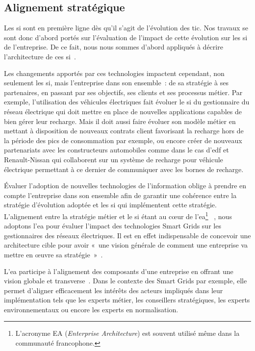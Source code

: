 \subsection{Alignement stratégique}

Les \gls{si} sont en première ligne dès qu'il s'agit de l'évolution des 
\gls{tic}. Nos 
travaux se sont donc d'abord portés sur l'évaluation de l'impact de cette 
évolution sur les \gls{si} de l'entreprise. De ce fait, nous nous sommes d'abord 
appliqués à décrire l'architecture de ces \gls{si}~\cite{seghiri2015simulation}. 

Les changements apportés par ces technologies impactent cependant, non seulement 
les \gls{si}, mais l'entreprise dans son ensemble~: de sa stratégie à ses 
partenaires, en passant par ses objectifs, ses clients et ses processus métier. 
Par exemple, 
l'utilisation des véhicules électriques fait évoluer le \gls{si} du 
gestionnaire du réseau électrique qui doit mettre en place de nouvelles 
applications capables de bien gérer leur recharge. Mais il doit aussi faire 
évoluer son modèle métier en mettant à disposition de nouveaux contrats 
client favorisant la recharge hors de la période des pics de consommation par exemple, 
ou encore créer de nouveaux partenariats avec les constructeurs 
automobiles comme dans le cas d'\gls{edf} et Renault-Nissan qui collaborent sur 
un système de recharge pour véhicule électrique permettant à ce dernier de 
communiquer avec les bornes de recharge.

Évaluer l'adoption de nouvelles technologies de l'information oblige à prendre 
en compte l'entreprise dans son ensemble afin de garantir une cohérence entre 
la stratégie d'évolution adoptée et les \gls{si} qui implémentent cette 
stratégie. L'alignement entre la stratégie métier et le \gls{si} étant
au cœur de l'\gls{ea}\footnote{L'acronyme EA (\textit{Enterprise Architecture}) 
est souvent utilisé même dans la communauté francophone.}
~\cite{zachman1997enterprise}, nous
adoptons l'\gls{ea} pour évaluer l'impact des technologies Smart Grids sur les
gestionnaires des réseaux électriques. Il est en effet indispensable de
concevoir une architecture cible pour avoir  «~une vision générale de comment
une entreprise va mettre en œuvre sa stratégie~»~\cite{ross2006enterprise}.

L'\gls{ea} participe à l'alignement des composants d'une entreprise en offrant 
une vision globale et transverse~\cite{zachman1987framework}. Dans le contexte 
des 
Smart Grids par exemple, elle permet d'aligner efficacement les intérêts des 
acteurs impliqués dans leur implémentation tels que les experts métier, les 
conseillers stratégiques, les experts environnementaux ou encore les experts en 
normalisation.

